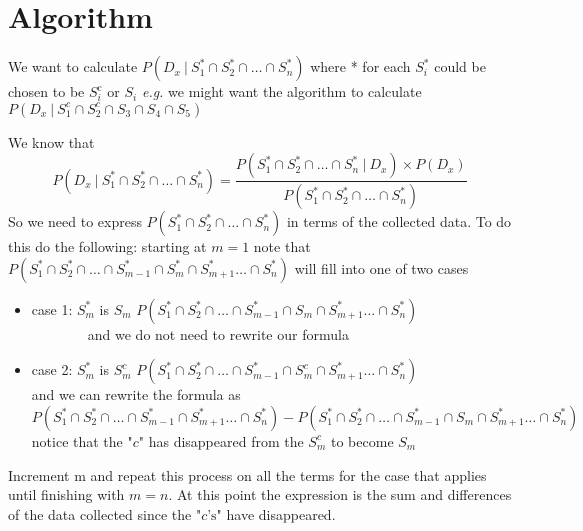 \documentclass{article}
\begin{document}
\section{Algorithm}

We want to calculate
$P\left(D_{x}~|~S_{1}^{*} \cap S_{2}^{*} \cap \ldots \cap S_{n}^{*}\right)$
where * for each $S_{i}^{*}$ could be chosen to be $S_{i}^{\text {c}}$ or $S_{i}$ 
\textit{e.g.} we might want the algorithm to calculate $P\left(D_{x}~|~S_{1}^{c} \cap S_{2}^{c} \cap S_{3} \cap S_{4} \cap S_{5}\right)$\par
\medskip We know that \smallskip
%
\begin{equation} \label{eq2}
P\left(D_{x}~|~S_{1}^{*} \cap S_{2}^{*} \cap \ldots \cap S_{n}^{*}\right) = \frac{P\left(S_{1}^{*} \cap S_{2}^{*} \cap \ldots \cap S_{n}^{*} ~|~D_{x}\right) \times P\left(D_{x}\right)}{P\left(S_{1}^{*} \cap S_{2}^{*} \cap \ldots \cap S_{n}^{*}\right)}
\end{equation}
%
So we need to express $P\left(S_{1}^{*} \cap S_{2}^{*} \cap \ldots \cap S_{n}^{*}\right)$ in terms of the collected data. To do this do the following: starting at $m = 1$ note that $P\left(S_{1}^{*} \cap S_{2}^{*} \cap \ldots \cap S_{m-1}^{*} \cap S_{m}^{*} \cap S_{m+1}^{*} \ldots \cap S_{n}^{*}\right)$ will fill into one of two cases\bigskip
%
\begin{itemize}
    \item case 1: $S_{m}^{*}$ is $S_{m}$ \implies $P\left(S_{1}^{*} \cap S_{2}^{*} \cap \ldots \cap S_{m-1}^{*} \cap S_{m} \cap S_{m+1}^{*} \ldots \cap S_{n}^{*}\right)$ \\~~~~~~~~and we do not need to rewrite our formula
    \item case 2: $S_{m}^{*}$ is $S_{m}^{c}$ \implies $P\left(S_{1}^{*} \cap S_{2}^{*} \cap \ldots \cap S_{m-1}^{*} \cap S_{m}^{c} \cap S_{m+1}^{*} \ldots \cap S_{n}^{*}\right)$
    \\ and we can rewrite the formula as
    \\ $P\left(S_{1}^{*} \cap S_{2}^{*} \cap \ldots \cap S_{m-1}^{*} \cap S_{m+1}^{*} \ldots \cap S_{n}^{*}\right) - P\left(S_{1}^{*} \cap S_{2}^{*} \cap \ldots \cap S_{m-1}^{*} \cap S_{m} \cap S_{m+1}^{*} \ldots \cap S_{n}^{*}\right)$
    \\ notice that the "$c$" has disappeared from the $S_{m}^{c}$ to become $S_{m}$
\end{itemize}\medskip
%
Increment m and repeat this process on all the terms for the case that applies until finishing with $m = n$. At this point the expression is the sum and differences of the data collected since the "$c\text{'s}$" have disappeared.
\end{document}
